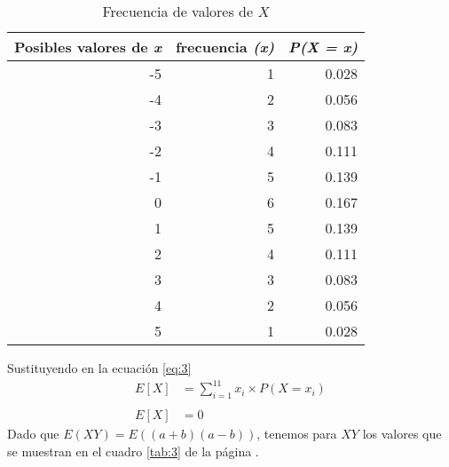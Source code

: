 \documentclass{article}
\begin{document}
\begin{table}[H]
  \centering
  \caption{Frecuencia de valores de $X$ }
    \begin{tabular}{rrr}
    \toprule
    \multicolumn{1}{p{5.39em}}{\textbf{Posibles valores de \textit{\textbf{x}}}} & \multicolumn{1}{l}{\textbf{frecuencia  \textit{\textbf{(x)}}}}  & \multicolumn{1}{l}{\textit{\textbf{P(X = x)}}} \\
    \midrule
    -5    & 1     & 0.028 \\
    -4    & 2     & 0.056 \\
    -3    & 3     & 0.083 \\
    -2    & 4     & 0.111 \\
    -1    & 5     & 0.139 \\
    0     & 6     & 0.167 \\
    1     & 5     & 0.139 \\
    2     & 4     & 0.111 \\
    3     & 3     & 0.083 \\
    4     & 2     & 0.056 \\
    5     & 1     & 0.028 \\
    \bottomrule
    \end{tabular}%
  \label{tab:2}%
\end{table}%
Sustituyendo en la ecuación \ref{eq:3}
\begin{equation}
\begin{array}{ll}
   E[X] &= \sum_{i=1}^{11} x_{i}  \times P(X=x_{i})\\
   &\\
   E[X] & = 0
  \end{array}
\end{equation}
Dado que $E(XY)= E((a+b)(a-b))$, tenemos para $XY$ los valores que se muestran en el cuadro \ref{tab:3} de la página \pageref{tab:3}. 
\end{document}
